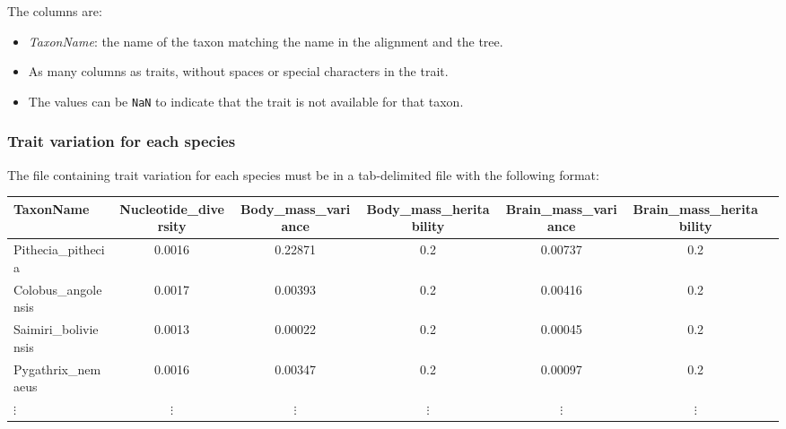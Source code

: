 \documentclass{article}
\begin{document}
The columns are:
\begin{itemize}
    \item \emph{TaxonName}: the name of the taxon matching the name in the alignment and the tree.
    \item As many columns as traits, without spaces or special characters in the trait.
    \item The values can be \texttt{NaN} to indicate that the trait is not available for that taxon.
\end{itemize}

\newpage
\subsubsection{Trait variation for each species}

The file containing trait variation for each species must be in a tab-delimited file with the following format:
\begin{center}
    \begin{adjustbox}{width = 1.0\textwidth}
        \begin{tabular}{|l|c|c|c|c|c|c|}
            \hline
            TaxonName            & Nucleotide\_diversity & Body\_mass\_variance & Body\_mass\_heritability & Brain\_mass\_variance & Brain\_mass\_heritability \\
            \hline
            Pithecia\_pithecia   & 0.0016                & 0.22871              & 0.2                      & 0.00737               & 0.2                       \\
            Colobus\_angolensis  & 0.0017                & 0.00393              & 0.2                      & 0.00416               & 0.2                       \\
            Saimiri\_boliviensis & 0.0013                & 0.00022              & 0.2                      & 0.00045               & 0.2                       \\
            Pygathrix\_nemaeus   & 0.0016                & 0.00347              & 0.2                      & 0.00097               & 0.2                       \\
            $\vdots$             & $\vdots$              & $\vdots$             & $\vdots$                 & $\vdots$              & $\vdots$                  \\
            \hline
        \end{tabular}
        \label{tab:trait-variance}
    \end{adjustbox}
\end{center}
\end{document}
